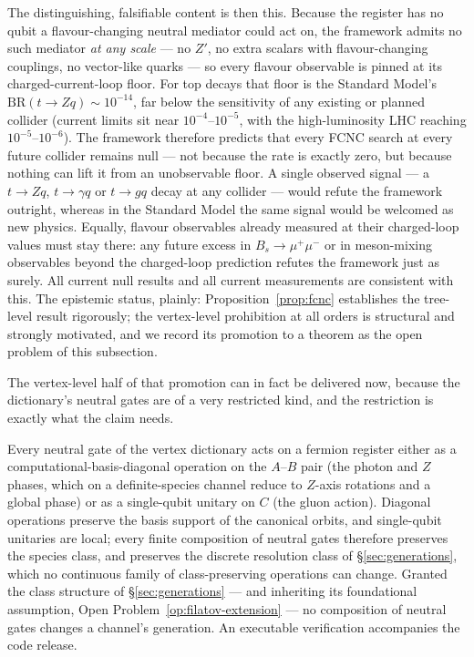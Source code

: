 The distinguishing, falsifiable content is then this. Because the register has no qubit a
flavour-changing neutral mediator could act on, the framework admits no such mediator \emph{at any
scale} --- no $Z'$, no extra scalars with flavour-changing couplings, no vector-like quarks ---
so every flavour observable is pinned at its charged-current-loop floor. For top decays that floor
is the Standard Model's $\mathrm{BR}(t\to Zq)\sim10^{-14}$, far below the sensitivity of any
existing or planned collider (current limits sit near $10^{-4}$--$10^{-5}$, with the high-luminosity
LHC reaching $10^{-5}$--$10^{-6}$). The framework therefore predicts that every FCNC search at
every future collider remains null --- not because the rate is exactly zero, but because nothing can
lift it from an unobservable floor. A single observed signal --- a $t\to Zq$, $t\to\gamma q$ or
$t\to gq$ decay at any collider --- would refute the framework outright, whereas in the Standard
Model the same signal would be welcomed as new physics. Equally, flavour observables already
measured at their charged-loop values must stay there: any future excess in $B_s\to\mu^+\mu^-$ or in
meson-mixing observables beyond the charged-loop prediction refutes the framework just as surely.
All current null results and all current measurements are consistent with this. The epistemic status,
plainly: Proposition~\ref{prop:fcnc} establishes the tree-level result rigorously; the vertex-level
prohibition at all orders is structural and strongly motivated, and we record its promotion to a
theorem as the open problem of this subsection.

The vertex-level half of that promotion can in fact be delivered now, because the dictionary's
neutral gates are of a very restricted kind, and the restriction is exactly what the claim needs.

\begin{proposition}\label{prop:neutral-blind}
Every neutral gate of the vertex dictionary acts on a fermion register either as a
computational-basis-diagonal operation on the $A$--$B$ pair (the photon and $Z$ phases, which on a
definite-species channel reduce to $Z$-axis rotations and a global phase) or as a single-qubit
unitary on $C$ (the gluon action). Diagonal operations preserve the basis support of the canonical
orbits, and single-qubit unitaries are local; every finite composition of neutral gates therefore
preserves the species class, and preserves the discrete resolution class of
\S\ref{sec:generations}, which no continuous family of class-preserving operations can change.
Granted the class structure of \S\ref{sec:generations} --- and inheriting its foundational
assumption, Open Problem~\ref{op:filatov-extension} --- no composition of neutral gates changes a
channel's generation. An executable verification accompanies the code release.
\end{proposition}

